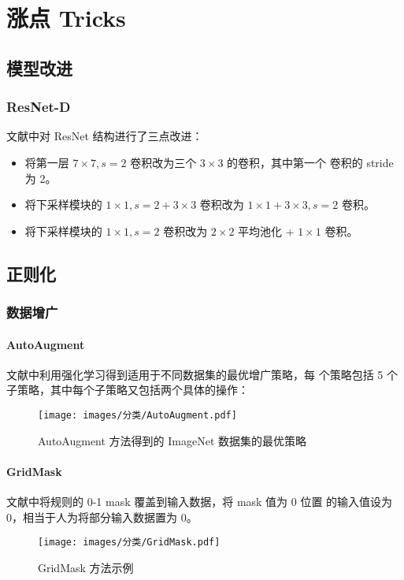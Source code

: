 \chapter{涨点 Tricks}
\section{模型改进}
\subsection{ResNet-D}
文献中对 ResNet 结构进行了三点改进：
\begin{itemize}
  \item 将第一层 $7 \times 7, s=2$ 卷积改为三个 $3 \times 3$ 的卷积，其中第一个
    卷积的 stride 为 2。
  \item 将下采样模块的 $1 \times 1, s=2 + 3 \times 3$ 卷积改为 $1 \times 1 + 3
    \times 3, s=2$ 卷积。
  \item 将下采样模块的 $1 \times 1, s=2$ 卷积改为 $2 \times 2$ 平均池化 + $1
    \times 1$ 卷积。
\end{itemize}

\section{正则化}
\subsection{数据增广}
\subsubsection{AutoAugment}
文献中利用强化学习得到适用于不同数据集的最优增广策略，每
个策略包括 5 个子策略，其中每个子策略又包括两个具体的操作：

\begin{figure}[ht]
  \centering
  \texttt{[image: images/分类/AutoAugment.pdf]}
  \caption{AutoAugment 方法得到的 ImageNet 数据集的最优策略}
  \label{fig:autoaugment}
\end{figure}


\subsubsection{GridMask}
文献中将规则的 0-1 mask 覆盖到输入数据，将 mask 值为 0 位置
的输入值设为 0，相当于人为将部分输入数据置为 0。

\begin{figure}[ht]
  \centering
  \texttt{[image: images/分类/GridMask.pdf]}
  \caption{GridMask 方法示例}
  \label{fig:gridmask}
\end{figure}

